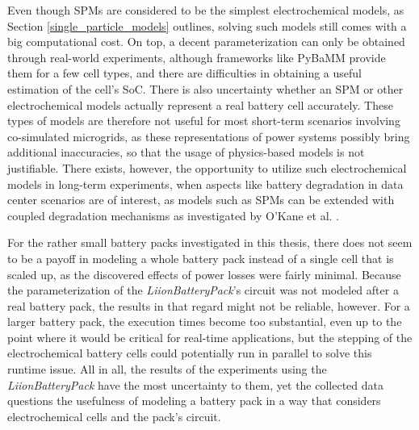 Even though SPMs are considered to be the simplest electrochemical models, as Section \ref{single_particle_models} outlines, solving such models still comes with a big computational cost. On top, a decent parameterization can only be obtained through real-world experiments, although frameworks like PyBaMM provide them for a few cell types, and there are difficulties in obtaining a useful estimation of the cell's SoC. There is also uncertainty whether an SPM or other electrochemical models actually represent a real battery cell accurately. These types of models are therefore not useful for most short-term scenarios involving co-simulated microgrids, as these representations of power systems possibly bring additional inaccuracies, so that the usage of physics-based models is not justifiable. There exists, however, the opportunity to utilize such electrochemical models in long-term experiments, when aspects like battery degradation in data center scenarios are of interest, as models such as SPMs can be extended with coupled degradation mechanisms as investigated by O'Kane et al. \cite{o2022lithium}.

For the rather small battery packs investigated in this thesis, there does not seem to be a payoff in modeling a whole battery pack instead of a single cell that is scaled up, as the discovered effects of power losses were fairly minimal. Because the parameterization of the \textit{LiionBatteryPack}'s circuit was not modeled after a real battery pack, the results in that regard might not be reliable, however. For a larger battery pack, the execution times become too substantial, even up to the point where it would be critical for real-time applications, but the stepping of the electrochemical battery cells could potentially run in parallel to solve this runtime issue. All in all, the results of the experiments using the \textit{LiionBatteryPack} have the most uncertainty to them, yet the collected data questions the usefulness of modeling a battery pack in a way that considers electrochemical cells and the pack's circuit.